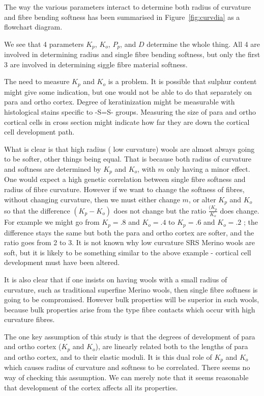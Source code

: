 \documentclass[titlepage]{article}  %
\begin{document}
The way the various parameters interact to determine both radius of curvature and fibre bending softness has been summarised in Figure~\ref{fig:curvdia} as a flowchart diagram.

We see that 4 parameters $K_{p}$, $K_{o}$, $P{_p}$, and $D$ determine the whole thing. All 4 are involved in determining radius and single fibre bending softness, but only the first 3 are involved in determining siggle fibre material softness. 

The need to measure $K_{p}$ and $ K_{o}$ is a problem. It is possible that sulphur content might give some indication, but one would not be able to do that separately on para and ortho cortex. Degree of keratinization might be measurable with histological stains specific to -S=S- groups. Measuring the size of para and ortho cortical cells in cross section might indicate how far they are down the cortical cell development path.

What is clear is that high radius ( low curvature) wools are almost always going to be softer, other things being equal. That is because both radius of curvature and softness are determined by  $K_{p}$ and $ K_{o}$, with $m$ only having a minor effect. One would expect a high genetic correlation between single fibre softness and radius of fibre curvature. However if we want to change the softness of fibres, without changing curvature, then we must either change $m$, or alter $K_{p}$ and $ K_{o}$ so that the difference $(K_{p} - K_{o})$ does not change but the ratio $\frac{(K_{p}}{K_{o}}$ does change. For example we might go from $K_{p} = .8$ and $K_{o} = .4$ to $K_{p} = .6$ and $K_{o} = .2$ ; the difference stays the same but both the para and ortho cortex are softer, and the ratio goes from 2 to 3. It is not known why low curvature SRS Merino wools are soft, but it is likely to be something similar to the above example  - cortical cell development must have been altered.

It is also clear that if one insists on having wools with a small radius of curvature, such as traditional superfine Merino wools, then single fibre softness is going to be compromised. However bulk properties will be superior in such wools, because bulk properties arise from the type fibre contacts which occur with high curvature fibres. 

The one key assumption of this study is that the degrees of development of para and ortho cortex ($K_{p}$ and $K_{o}$), are linearly related both to the lengths of para and ortho cortex, and to their elastic moduli.  It is this dual role of $K_{p}$ and $K_{o}$ which causes radius of curvature and softness to be correlated. There seems no way of checking this assumption. We can merely note that it seems reasonable that development of the cortex affects all its properties.
\end{document}

